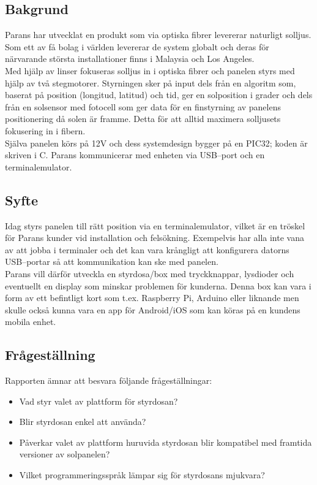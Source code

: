 \documentclass{article}
\begin{document}
        \subsection{Bakgrund} %
        \label{sub:bakgrund}
            Parans har utvecklat en produkt som via optiska fibrer levererar naturligt solljus. Som ett av få bolag i världen levererar de system globalt och deras för närvarande största installationer finns i Malaysia och Los Angeles.\\

            \noindent Med hjälp av linser fokuseras solljus in i optiska fibrer och panelen styrs med hjälp av två stegmotorer. Styrningen sker på input dels från en algoritm som, baserat på position (longitud, latitud) och tid, ger en solposition i grader och dels från en solsensor med fotocell som ger data för en finstyrning av panelens positionering då solen är framme. Detta för att alltid maximera solljusets fokusering in i fibern.\\

            \noindent Själva panelen körs på 12V och dess systemdesign bygger på en PIC32; koden är skriven i C. Parans kommunicerar med enheten via USB--port och en terminalemulator. 
        
        \subsection{Syfte} %
        \label{sub:syfte}
            Idag styrs panelen till rätt position via en terminalemulator, vilket är en tröskel för Parans kunder vid installation och felsökning.  Exempelvis har alla inte vana av att jobba i terminaler och det kan vara krångligt att konfigurera datorns USB--portar så att kommunikation kan ske med panelen. \\

            \noindent Parans vill därför utveckla en styrdosa/box med tryckknappar, lysdioder och eventuellt en display som minskar problemen för kunderna. Denna box kan vara i form av ett befintligt kort som t.ex. Raspberry Pi, Arduino eller liknande men skulle också kunna vara en app för Android/iOS som kan köras på en kundens mobila enhet.

        \subsection{Frågeställning} %
        \label{sub:fragestallning}
        Rapporten ämnar att besvara följande frågeställningar:
        \begin{itemize}
            \item Vad styr valet av plattform för styrdosan?
            \item Blir styrdosan enkel att använda?
            \item Påverkar valet av plattform huruvida styrdosan blir kompatibel med framtida versioner av solpanelen?
            \item Vilket programmeringsspråk lämpar sig för styrdosans mjukvara?
        \end{itemize}   
        
\end{document}
